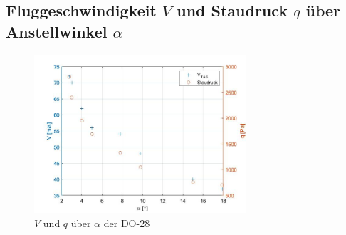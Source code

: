 \subsection{Fluggeschwindigkeit $V$ und Staudruck $q$ über Anstellwinkel $\alpha$}

\begin{figure}[H]
	\centering	\includegraphics[width=0.7\textwidth]{./Bilder/V_q_alpha.jpg}
	\caption{$V$ und $q$ über $\alpha$ der DO-28}
	\label{fig:V_q_alpha_DO28}
\end{figure}